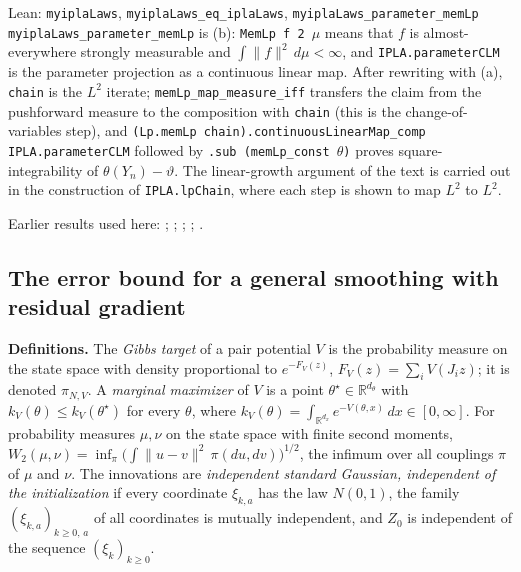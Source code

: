 \documentclass[11pt,a4paper]{report}
\begin{document}
\begin{leanbox}{Lean: \texttt{myiplaLaws}, \texttt{myiplaLaws\_\allowbreak{}eq\_\allowbreak{}iplaLaws}, \texttt{myiplaLaws\_\allowbreak{}parameter\_\allowbreak{}memLp}}
\texttt{myipla\allowbreak{}Laws\_\allowbreak{}parameter\_\allowbreak{}mem\allowbreak{}Lp} is (b): \texttt{Mem\allowbreak{}Lp f 2 \ensuremath{\mu}} means that \(f\) is almost-everywhere strongly measurable and \(\int\|f\|^2\,d\mu<\infty\), and \texttt{IPLA.\allowbreak{}parameter\allowbreak{}CLM} is the parameter projection as a continuous linear map. After rewriting with (a), \texttt{chain} is the \(L^2\) iterate; \texttt{mem\allowbreak{}Lp\_\allowbreak{}map\_\allowbreak{}measure\_\allowbreak{}iff} transfers the claim from the pushforward measure to the composition with \texttt{chain} (this is the change-of-variables step), and \texttt{(Lp.\allowbreak{}mem\allowbreak{}Lp chain).\allowbreak{}continuous\allowbreak{}Linear\allowbreak{}Map\_\allowbreak{}comp IPLA.\allowbreak{}parameter\allowbreak{}CLM} followed by \texttt{.\allowbreak{}sub (mem\allowbreak{}Lp\_\allowbreak{}const \ensuremath{\theta})} proves square-integrability of \(\theta(Y_n)-\vartheta\). The linear-growth argument of the text is carried out in the construction of \texttt{IPLA.\allowbreak{}lp\allowbreak{}Chain}, where each step is shown to map \(L^2\) to \(L^2\).
\end{leanbox}


Earlier results used here: \cite[Section~3.1.1]{LangevinLean2026IPLA}; \cite[Section~3.1.4]{LangevinLean2026IPLA}; \cite[Section~3.1.6]{LangevinLean2026IPLA}; \cite[Section~3.3.3]{LangevinLean2026IPLA}; \cite[Section~3.4.3]{LangevinLean2026IPLA}.
\subsection{\texorpdfstring{The error bound for a general smoothing with residual gradient}{The error bound for a general smoothing with residual gradient}}
\label{report-step-ProximalLangevin-MYIPLA-lean-3}


\textbf{Definitions.} The \emph{Gibbs target} of a pair potential \(V\) is the probability measure on the state space with density proportional to \(e^{-F_V(z)}\), \(F_V(z)=\sum_iV(J_iz)\); it is denoted \(\pi_{N,V}\). A \emph{marginal maximizer} of \(V\) is a point \(\theta^\star\in\mathbb R^{d_\theta}\) with \(k_V(\theta)\le k_V(\theta^\star)\) for every \(\theta\), where \(k_V(\theta)=\int_{\mathbb R^{d_x}}e^{-V(\theta,x)}\,dx\in[0,\infty]\). For probability measures \(\mu,\nu\) on the state space with finite second moments, \(W_2(\mu,\nu)=\inf_\pi\bigl(\int\|u-v\|^2\,\pi(du,dv)\bigr)^{1/2}\), the infimum over all couplings \(\pi\) of \(\mu\) and \(\nu\). The innovations are \emph{independent standard Gaussian, independent of the initialization} if every coordinate \(\xi_{k,a}\) has the law \(N(0,1)\), the family \((\xi_{k,a})_{k\ge0,\,a}\) of all coordinates is mutually independent, and \(Z_0\) is independent of the sequence \((\xi_k)_{k\ge0}\).
\end{document}
